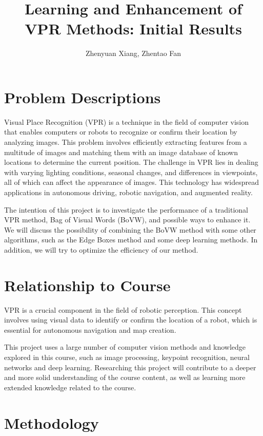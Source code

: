 \documentclass{article}
\title{Learning and Enhancement of VPR Methods: Initial Results}
\author{Zhenyuan Xiang, Zhentao Fan}
\date{}
\begin{document}
\maketitle

\section{Problem Descriptions}

Visual Place Recognition (VPR) is a technique in the field of computer vision that enables computers or robots to recognize or confirm their location by analyzing images. This problem involves efficiently extracting features from a multitude of images and matching them with an image database of known locations to determine the current position. The challenge in VPR lies in dealing with varying lighting conditions, seasonal changes, and differences in viewpoints, all of which can affect the appearance of images. This technology has widespread applications in autonomous driving, robotic navigation, and augmented reality.

The intention of this project is to investigate the performance of a traditional VPR method, Bag of Visual Words (BoVW), and possible ways to enhance it. We will discuss the possibility of combining the BoVW method with some other algorithms, such as the Edge Boxes method\cite{zitnick2014edge} and some deep learning methods\cite{zhang2021visual}. In addition, we will try to optimize the efficiency of our method.

\section{Relationship to Course}

VPR is a crucial component in the field of robotic perception. This concept involves using visual data to identify or confirm the location of a robot, which is essential for autonomous navigation and map creation.

This project uses a large number of computer vision methods and knowledge explored in this course, such as image processing, keypoint recognition, neural networks and deep learning. Researching this project will contribute to a deeper and more solid understanding of the course content, as well as learning more extended knowledge related to the course.

\section{Methodology}
\end{document}
